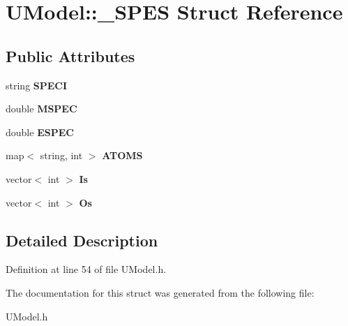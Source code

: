 \hypertarget{structUModel_1_1__SPES}{}\section{U\+Model\+:\+:\+\_\+\+S\+P\+ES Struct Reference}
\label{structUModel_1_1__SPES}
\subsection*{Public Attributes}
\begin{DoxyCompactItemize}
\item 
\mbox{\label{structUModel_1_1__SPES_a8ab9e7a46e72a4696be7b5fe061b131d}} 
string {\bfseries S\+P\+E\+CI}
\item 
\mbox{\label{structUModel_1_1__SPES_ad843966f3d86896a2ed9b5211c6d0e4b}} 
double {\bfseries M\+S\+P\+EC}
\item 
\mbox{\label{structUModel_1_1__SPES_a02f65715badbc393366111c4dfd062ea}} 
double {\bfseries E\+S\+P\+EC}
\item 
\mbox{\label{structUModel_1_1__SPES_a9a249980c66775fd348097ea84cb7faf}} 
map$<$ string, int $>$ {\bfseries A\+T\+O\+MS}
\item 
\mbox{\label{structUModel_1_1__SPES_a4fa48d3c09323f2d7a4057472d9a46d5}} 
vector$<$ int $>$ {\bfseries Is}
\item 
\mbox{\label{structUModel_1_1__SPES_a7586f67dd5adbd54aa53fdaab24d67ce}} 
vector$<$ int $>$ {\bfseries Os}
\end{DoxyCompactItemize}


\subsection{Detailed Description}


Definition at line 54 of file U\+Model.\+h.



The documentation for this struct was generated from the following file\+:\begin{DoxyCompactItemize}
\item 
U\+Model.\+h\end{DoxyCompactItemize}
